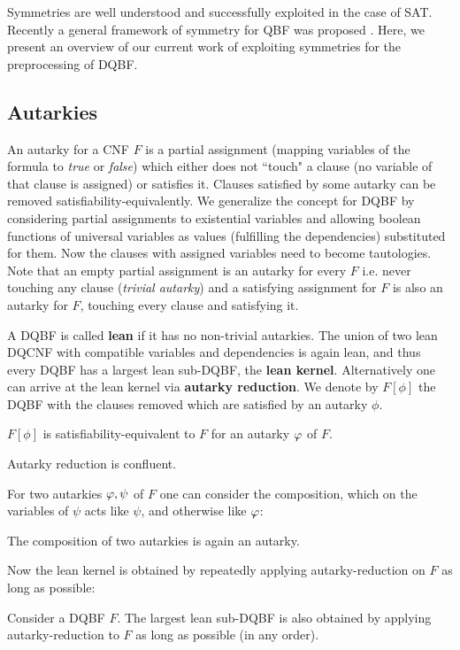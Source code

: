 \documentclass[conference]{IEEEtran}
\begin{document}
Symmetries are well understood and successfully exploited in the case of SAT. 
%
Recently a general framework of symmetry for QBF was proposed \cite{kauers2018symmetries}.
%
Here, we present an overview of our current work of exploiting symmetries for the preprocessing of DQBF.   

\subsection{Autarkies}
\label{sec:aut}
An autarky for a CNF $F$ is a partial assignment (mapping variables of the formula to \textit{true} or \textit{false}) which either does not ``touch" a clause (no variable of that clause is assigned) or satisfies it.
%
Clauses satisfied by some autarky can be removed satisfiability-equivalently. 
%
We generalize the concept for DQBF by considering partial assignments to existential variables and allowing boolean functions of universal variables as values (fulfilling the dependencies) substituted for them.
%
Now the clauses with assigned variables need to become tautologies.
%
Note that an empty partial assignment is an autarky for every $F$ i.e. never touching any clause (\textit{trivial autarky}) and a satisfying assignment for $F$ is also an autarky for $F$, touching every clause and satisfying it.

A DQBF is called \textbf{lean} if it has no non-trivial autarkies.
The union of two lean DQCNF with compatible variables and dependencies is again lean, and thus every DQBF has a largest lean sub-DQBF, the \textbf{lean kernel}.
Alternatively one can arrive at the lean kernel via \textbf{autarky reduction}.
%
We denote by $F[\phi]$ the DQBF with the clauses removed which are satisfied by an autarky $\phi$. \vspace{-1em}
\begin{lem}\label{lem:autsateq}
	$F[\phi]$ is satisfiability-equivalent to $F$ for an autarky $\varphi$ of $F$.
\end{lem}

\begin{lem}\label{lem:compaut}
Autarky reduction is confluent.
\end{lem}

For two autarkies $\varphi, \psi$ of $F$ one can consider the composition, %
 which on the variables of $\psi$ acts like $\psi$, and otherwise like $\varphi$: \vspace{-1em}
\begin{lem}\label{lem:compaut}
	The composition of two autarkies is again an autarky.
\end{lem}
Now the lean kernel is obtained by repeatedly applying autarky-reduction on $F$ as long as possible:
\vspace{-1em}
\begin{lem}\label{lem:decomp}
	Consider a DQBF $F$. The largest lean sub-DQBF is also obtained by applying autarky-reduction to $F$ as long as possible (in any order).
\end{lem}
\end{document}
